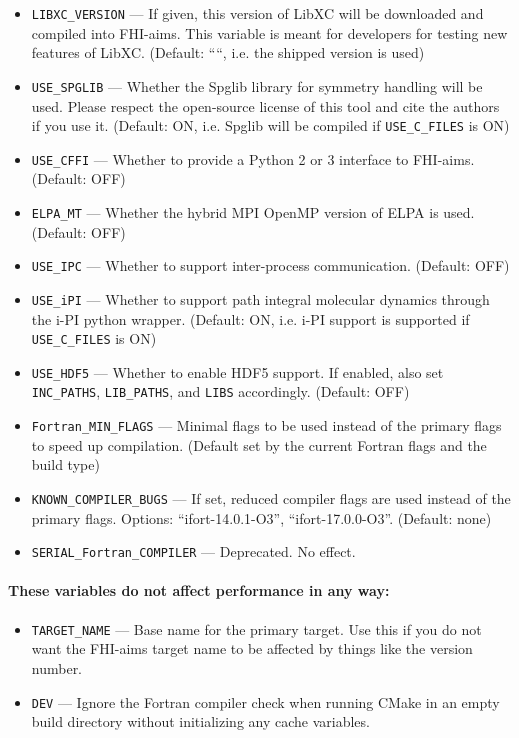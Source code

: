 \begin{itemize}
\item \texttt{LIBXC\_VERSION} --- If given, this version of LibXC will be downloaded and compiled into FHI-aims. This variable is meant for developers for testing new features of LibXC. (Default: ````, i.e. the shipped version is used)
\item \texttt{USE\_SPGLIB} ---  Whether the Spglib library for symmetry handling will be used. Please respect the open-source license of this tool and cite the authors if you use it. (Default: ON, i.e. Spglib will be compiled if \texttt{USE\_C\_FILES} is ON)
\item \texttt{USE\_CFFI} --- Whether to provide a Python 2 or 3 interface to FHI-aims. (Default: OFF)
\item \texttt{ELPA\_MT} --- Whether the hybrid MPI OpenMP version of ELPA is used. (Default: OFF)
\item \texttt{USE\_IPC} --- Whether to support inter-process communication. (Default: OFF)
\item \texttt{USE\_iPI} --- Whether to support path integral molecular dynamics through the i-PI python wrapper. (Default: ON, i.e. i-PI support is supported if \texttt{USE\_C\_FILES} is ON)
\item \texttt{USE\_HDF5} --- Whether to enable HDF5 support. If enabled, also set \texttt{INC\_PATHS}, \texttt{LIB\_PATHS}, and \texttt{LIBS} accordingly. (Default: OFF)
\item \texttt{Fortran\_MIN\_FLAGS} --- Minimal flags to be used instead of the primary flags to speed up compilation. (Default set by the current Fortran flags and the build type)
\item \texttt{KNOWN\_COMPILER\_BUGS} --- If set, reduced compiler flags are used instead of the primary flags. Options: ``ifort-14.0.1-O3'', ``ifort-17.0.0-O3''. (Default: none)
\item \texttt{SERIAL\_Fortran\_COMPILER} --- Deprecated. No effect.
\end{itemize}
\paragraph{These variables do not affect performance in any way:}
\begin{itemize}
\item \texttt{TARGET\_NAME} --- Base name for the primary target. Use this if you do not want the FHI-aims target name to be affected by things like the version number.
\item \texttt{DEV} --- Ignore the Fortran compiler check when running CMake in an empty build directory without initializing any cache variables.
\end{itemize}

